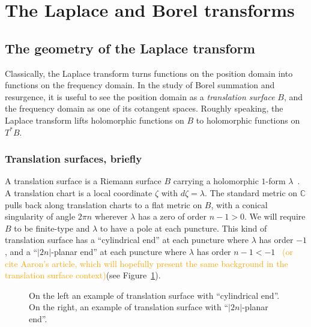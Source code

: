 \documentclass{article}
\newcommand{\C}{\mathbb{C}}
\theoremstyle{definition}
\theoremstyle{plain}
\begin{document}
\section{The Laplace and Borel transforms}\label{sec:Laplace-Borel-general}
\subsection{The geometry of the Laplace transform}\label{sec:geometry_laplace}
Classically, the Laplace transform turns functions on the position domain into functions on the frequency domain. In the study of Borel summation and resurgence, it is useful to see the position domain as a {\em translation surface} $B$, and the frequency domain as one of its cotangent spaces. Roughly speaking, the Laplace transform lifts holomorphic functions on $B$ to holomorphic functions on $T^*B$.
%
\subsubsection{Translation surfaces, briefly}
%
A translation surface is a Riemann surface $B$ carrying a holomorphic $1$-form $\lambda$~\cite{zorich2006flat}. A translation chart is a local coordinate $\zeta$ with $d\zeta = \lambda$. The standard metric on $\C$ pulls back along translation charts to a flat metric on $B$, with a conical singularity of angle $2\pi n$ wherever $\lambda$ has a zero of order $n-1 > 0$. We will require $B$ to be finite-type and $\lambda$ to have a pole at each puncture. This kind of translation surface has a ``cylindrical end'' at each puncture where $\lambda$ has order $-1$, and a ``$|2n|$-planar end'' at each puncture where $\lambda$ has order $n-1 < -1$~\cite[Section 2.5]{gupta2013meromorphic} \textcolor{orange}{(or cite Aaron's article, which will hopefully present the same background in the translation surface context)}(see Figure~\ref{fig:translation_surface}).
\begin{figure}[ht]
    \centering
    \caption{On the left an example of translation surface with ``cylindrical end''. On the right, an example of translation surface with  ``$|2n|$-planar end''. }
    \label{fig:translation_surface}
\end{figure}
%
\end{document}
